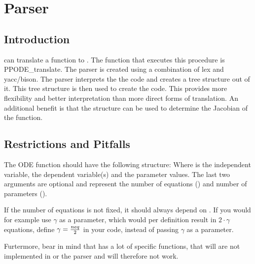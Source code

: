 \chapter{Parser}
\section{Introduction}
\PPODESUITE can translate a \MATLAB function to \Fortran. The function that executes this procedure is PPODE\_translate. The parser is created using a combination of lex and yacc/bison. The parser interprets the the \MATLAB code and creates a tree structure out of it. This tree structure is then used to create the \Fortran code. This provides more flexibility and better interpretation than more direct forms of translation. An additional benefit is that the structure can be used to determine the Jacobian of the function.

\section{Restrictions and Pitfalls}
The \MATLAB ODE function should have the following structure:
Where  is the independent variable,  the dependent variable(s) and  the parameter values. The last two arguments are optional and represent the number of equations () and number of parameters ().

If the number of equations is not fixed, it should always depend on . If you would for example use $\gamma$ as a parameter, which would per definition result in $2\cdot\gamma$ equations, define $\gamma = {neq \over 2}$ in your code, instead of passing $\gamma$ as a parameter.

Furtermore, bear in mind that \MATLAB has a lot of specific functions, that will are not implemented in \Fortran or the parser and will therefore not work.